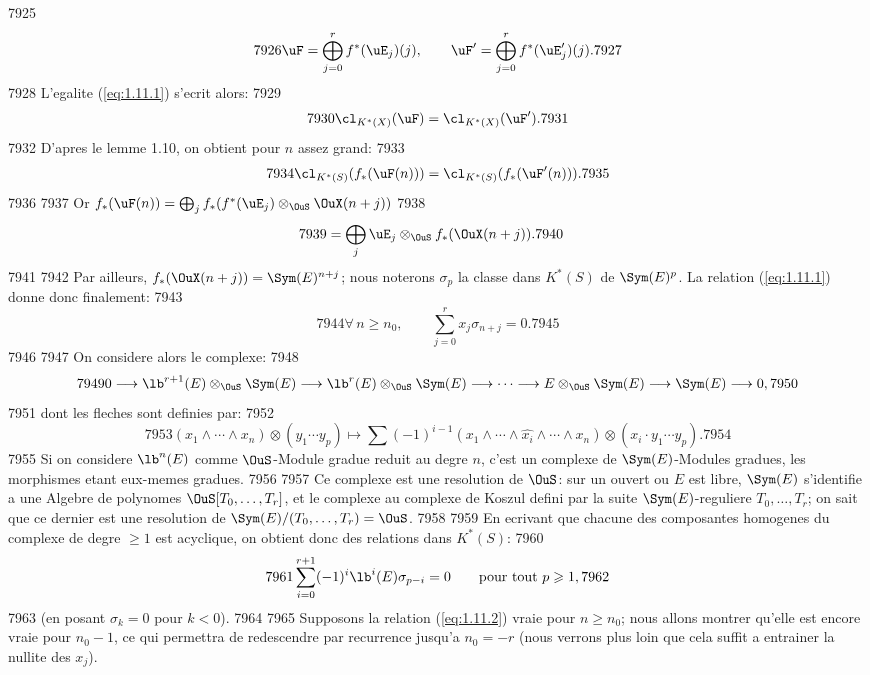   7925	\[
  7926	\uF = \bigoplus_{j=0}^{r} f^*(\uE_j)(j), \qquad \uF' = \bigoplus_{j=0}^{r} f^*(\uE'_j)(j).
  7927	\]
  7928	L'egalite (\ref{eq:1.11.1}) s'ecrit alors:
  7929	\[
  7930	\cl_{K^*(X)}(\uF) = \cl_{K^*(X)}(\uF').
  7931	\]
  7932	D'apres le lemme 1.10, on obtient pour $n$ assez grand:
  7933	\[
  7934	\cl_{K^*(S)}(f_*(\uF(n))) = \cl_{K^*(S)}(f_*(\uF'(n))).
  7935	\]
  7936	
  7937	Or $f_*(\uF(n)) = \bigoplus_j f_*(f^*(\uE_j) \otimes_{\OuS} \OuX(n+j))$
  7938	\begin{align*}
  7939	&= \bigoplus_j \uE_j \otimes_{\OuS} f_*(\OuX(n+j)).
  7940	\end{align*}
  7941	
  7942	Par ailleurs, $f_*(\OuX(n+j)) = \Sym(E)^{n+j}$; nous noterons $\sigma_p$ la classe dans $K^*(S)$ de $\Sym(E)^p$. La relation (\ref{eq:1.11.1}) donne donc finalement:
  7943	\begin{equation}\label{eq:1.11.2}
  7944	\forall\, n \geqslant n_0, \qquad \sum_{j=0}^{r} x_j \sigma_{n+j} = 0.
  7945	\end{equation}
  7946	
  7947	On considere alors le complexe:
  7948	\[
  7949	0 \longrightarrow \lb^{r+1}(E) \otimes_{\OuS} \Sym(E) \longrightarrow \lb^r(E) \otimes_{\OuS} \Sym(E) \longrightarrow \cdots \longrightarrow E \otimes_{\OuS} \Sym(E) \longrightarrow \Sym(E) \longrightarrow 0,
  7950	\]
  7951	dont les fleches sont definies par:
  7952	\[
  7953	(x_1 \wedge \cdots \wedge x_n) \otimes (y_1 \cdots y_p) \longmapsto \sum (-1)^{i-1} (x_1 \wedge \cdots \wedge \widehat{x_i} \wedge \cdots \wedge x_n) \otimes (x_i \cdot y_1 \cdots y_p).
  7954	\]
  7955	Si on considere $\lb^n(E)$ comme $\OuS$-Module gradue reduit au degre $n$, c'est un complexe de $\Sym(E)$-Modules gradues, les morphismes etant eux-memes gradues.
  7956	
  7957	Ce complexe est une resolution de $\OuS$: sur un ouvert ou $E$ est libre, $\Sym(E)$ s'identifie a une Algebre de polynomes $\OuS[T_0, \ldots, T_r]$, et le complexe au complexe de Koszul defini par la suite $\Sym(E)$-reguliere $T_0, \ldots, T_r$; on sait que ce dernier est une resolution de $\Sym(E)/(T_0, \ldots, T_r) = \OuS$.
  7958	
  7959	En ecrivant que chacune des composantes homogenes du complexe de degre $\geqslant 1$ est acyclique, on obtient donc des relations dans $K^*(S)$:
  7960	\begin{equation}\label{eq:1.11.3}
  7961	\sum_{i=0}^{r+1} (-1)^i \lb^i(E) \sigma_{p-i} = 0 \qquad \text{pour tout } p \geqslant 1,
  7962	\end{equation}
  7963	(en posant $\sigma_k = 0$ pour $k < 0$).
  7964	
  7965	Supposons la relation (\ref{eq:1.11.2}) vraie pour $n \geqslant n_0$; nous allons montrer qu'elle est encore vraie pour $n_0-1$, ce qui permettra de redescendre par recurrence jusqu'a $n_0 = -r$ (nous verrons plus loin que cela suffit a entrainer la nullite des $x_j$).
